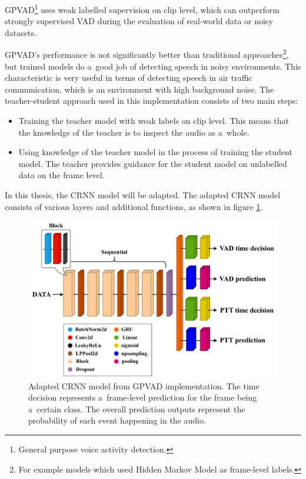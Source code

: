     GPVAD\footnote{General purpose voice activity detection.} uses weak labelled supervision on clip level, which can outperform strongly supervised VAD during the evaluation of real-world data or noisy datasets. 
    
    GPVAD's performance is not significantly better than traditional approaches\footnote{For example models which used Hidden Markov Model as frame-level labels.}, but trained models do a~good job of detecting speech in noisy environments. This characteristic is very useful in terms of detecting speech in air traffic communication, which is an environment with high background noise. The teacher-student approach used in this implementation consists of two main steps:
    
    \begin{itemize}
        \item Training the teacher model with weak labels on clip level. This means that the knowledge of the teacher is to inspect the audio as a~whole. 
        \item Using knowledge of the teacher model in the process of training the student model.    The teacher provides guidance for the student model on unlabelled data on the frame level.
    \end{itemize}
    
    In this thesis, the CRNN model will be adapted. The adapted CRNN model consists of various layers and additional functions, as shown in figure \ref{fig:gpvadarch}. 
    

    \begin{figure}[ht!]
        \centering
        \includegraphics[width = \textwidth]{obrazky-figures/GPVAD_arch.pdf}
        \caption{Adapted CRNN model from GPVAD implementation. The time decision represents a~frame-level prediction for the frame being a~certain class. The overall prediction outputs represent the probability of each event happening in the audio. }
        \label{fig:gpvadarch}
    \end{figure}
    
